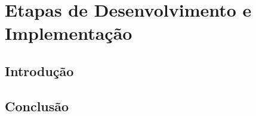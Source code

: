 \chapter{Etapas de Desenvolvimento e Implementação}
\label{ch::imp-test}

\section{Introdução}
\label{sec::imp-test:intro}

\section{Conclusão}
\label{sec::imp-test:conc}
